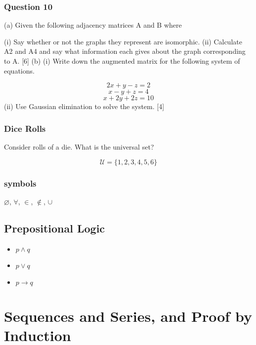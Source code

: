 \documentclass[]{report}
\begin{document}
\subsection*{Question 10}

(a) Given the following adjacency matrices A and B where
%
%
%



(i) Say whether or not the graphs they represent are isomorphic.
(ii) Calculate A2 and A4 and say what information each gives about the graph
corresponding to A. [6]
(b) (i) Write down the augmented matrix for the following system of equations.

\[2x + y - z = 2\]
\[x - y + z = 4\]
\[x + 2y + 2z = 10\]
(ii) Use Gaussian elimination to solve the system. [4]



\subsection*{Dice Rolls}
Consider rolls of a die. What is the universal set?

\[ \mathcal{U} = \{1,2,3,4,5,6\} \]


\subsection*{symbols}
$\varnothing$,
$\forall$,
$\in$,
$\notin$,
$\cup$
\newpage

\section*{Prepositional Logic}


\begin{itemize}
\item $p \wedge q$
\item $p \vee q$
\item $p \rightarrow q$
\end{itemize}
\newpage
\chapter{Sequences and Series, and Proof by Induction}
\end{document}
